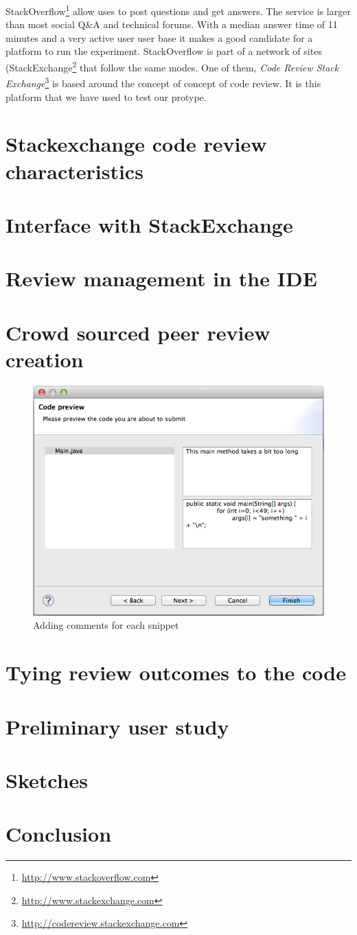 \documentclass{sigchi}
\begin{document}
StackOverflow\footnote{\url{http://www.stackoverflow.com}} allow uses to post questions and get
answers. The service is larger than most social Q\&A and technical forums. With a median answer time 
of 11 minutes and a very active user user base \cite{Mamykina2011} it makes a good candidate for a
platform to run the experiment. StackOverflow is part of a network of sites (StackExchange\footnote{\url{http://www.stackexchange.com}} that follow the same modes. One of them, \emph{Code
Review Stack Exchange}\footnote{\url{http://codereview.stackexchange.com}} is based around the
concept of concept of code review. It is this platform that we have used to test our protype.

\section{Stackexchange code review characteristics}
\section{Interface with StackExchange}
\section{Review management in the IDE}
\section{Crowd sourced peer review creation}

\begin{figure}[hbt]
	\includegraphics[width=\columnwidth]{wizard.png}
\caption{Adding comments for each snippet}
\label{fig:wizard}
\end{figure}

\section{Tying review outcomes to the code}
\section{Preliminary user study}
\section{Sketches}
\section{Conclusion}



\end{document}
